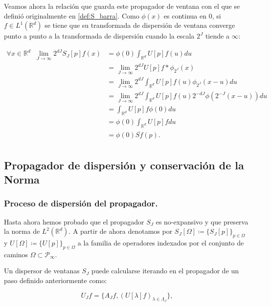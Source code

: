\medskip

\noindent Veamos ahora la relación que guarda este propagador de ventana con el que se definió originalmente en \autoref{def:S_barra}. Como $\phi(x)$ es continua en $0$, si $f\in L^1 (\mathbb{R}^d)$ se tiene que su transformada de dispersión de ventana converge punto a punto a la transformada de dispersión cuando la escala $2^J$ tiende a $\infty$: 

\begin{align*}
    \forall x \in \mathbb{R}^d \;\; \lim_{J \rightarrow \infty} 2^{dJ} S_J[p]f(x) &=\phi(0)\int_{\mathbb{R}^d}U[p]f(u) du \\
    &=\lim_{J \rightarrow \infty} 2^{dJ} U[p]f \ast \phi_{2^J}(x) \\
    &=\lim_{J \rightarrow \infty} 2^{dJ} \int_{\mathbb{R}^d} U[p]f(u)\phi_{2^J}(x-u) du \\
    &=\lim_{J \rightarrow \infty} 2^{dJ} \int_{\mathbb{R}^d} U[p]f(u) 2^{-dJ} \phi(2^{-J}(x-u)) du   \\
    &= \int_{\mathbb{R}^d} U[p]f \phi(0) du  \\
    &= \phi(0) \int_{\mathbb{R}^d} U[p]f du  \\
    &= \phi(0)\overline{Sf}(p).\\ 
\end{align*}

\subsection{Propagador de dispersión y conservación de la Norma} \label{ch:seccion13}


\subsubsection{Proceso de dispersión del propagador.}

\noindent Hasta ahora hemos probado que el propagador $S_J$ es no-expansivo y que preserva la norma de $L^2(\mathbb{R}^d)$. A partir de ahora denotamos por $S_J[\Omega] \coloneqq \lbrace S_J[p] \rbrace_{p\in\Omega}$ y $U[\Omega]\coloneqq \lbrace U[p] \rbrace_{p\in\Omega}$ a la familia de operadores indexados por el conjunto de caminos $\Omega \subset \mathcal{P}_\infty$.

\medskip

\noindent Un dispersor de ventanas $S_J$ puede calcularse iterando en el propagador de un paso definido anteriormente como: 

$$U_Jf=\lbrace A_Jf, (U[\lambda]f)_{\lambda\in\Lambda_J} \rbrace,$$

